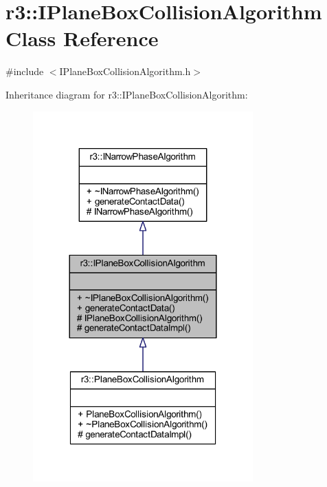 \hypertarget{classr3_1_1_i_plane_box_collision_algorithm}{}\section{r3\+:\+:I\+Plane\+Box\+Collision\+Algorithm Class Reference}
\label{classr3_1_1_i_plane_box_collision_algorithm}


{\ttfamily \#include $<$I\+Plane\+Box\+Collision\+Algorithm.\+h$>$}



Inheritance diagram for r3\+:\+:I\+Plane\+Box\+Collision\+Algorithm\+:\nopagebreak
\begin{figure}[H]
\begin{center}
\leavevmode
\includegraphics[width=240pt]{classr3_1_1_i_plane_box_collision_algorithm__inherit__graph}
\end{center}
\end{figure}


